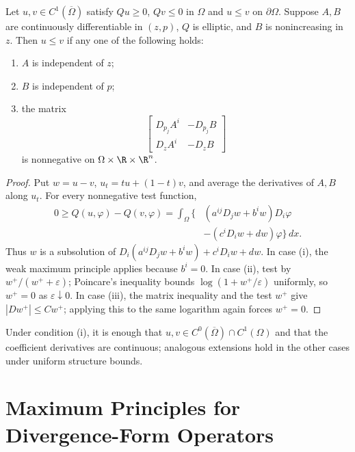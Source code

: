 \begin{theorem}
\label{gilbarg-trudinger.thm.10.7.comparison-divergence-form}
Let $u,v\in C^1(\overline\Omega)$ satisfy $Qu\ge0$, $Qv\le0$ in
$\Omega$ and $u\le v$ on $\partial\Omega$.  Suppose $A,B$ are
continuously differentiable in $(z,p)$, $Q$ is elliptic, and $B$ is
nonincreasing in $z$.  Then $u\le v$ if any one of the following holds:
\begin{enumerate}
\item[(i)] $A$ is independent of $z$;
\item[(ii)] $B$ is independent of $p$;
\item[(iii)] the matrix
\[
\begin{bmatrix}
D_{p_j}A^i&-D_{p_j}B\\
D_zA^i&-D_zB
\end{bmatrix}
\]
is nonnegative on $\Omega\times\R\times\R^n$.
\end{enumerate}
\end{theorem}
\begin{proof}
\sketch Put $w=u-v$, $u_t=tu+(1-t)v$, and average the derivatives of
$A,B$ along $u_t$.  For every nonnegative test function,
\begin{equation}
\begin{aligned}
0\ge Q(u,\varphi)-Q(v,\varphi)
=\int_\Omega\{&(a^{ij}D_jw+b^iw)D_i\varphi\\
&-(c^iD_iw+dw)\varphi\}\,dx.
\end{aligned}
\tag{10.22}
\end{equation}
Thus $w$ is a subsolution of
$D_i(a^{ij}D_jw+b^iw)+c^iD_iw+dw$.  In case \textup{(i)}, the weak
maximum principle applies because $b^i=0$.  In case \textup{(ii)}, test by
$w^+/(w^++\varepsilon)$; Poincare's inequality bounds
$\log(1+w^+/\varepsilon)$ uniformly, so $w^+=0$ as
$\varepsilon\downarrow0$.  In case \textup{(iii)}, the matrix inequality
and the test $w^+$ give $|Dw^+|\le Cw^+$; applying this to the same
logarithm again forces $w^+=0$.
\end{proof}

Under condition \textup{(i)}, it is enough that
$u,v\in C^0(\overline\Omega)\cap C^1(\Omega)$ and that the coefficient
derivatives are continuous; analogous extensions hold in the other cases
under uniform structure bounds.

\section{Maximum Principles for Divergence-Form Operators}

